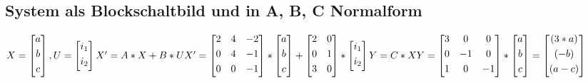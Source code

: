 \documentclass[11pt, a4paper, twoside]{article}   	%
\begin{document}
\subsection{System als Blockschaltbild und in A, B, C Normalform}
$
X = \begin{bmatrix}
	a \\[0.3em]
	b \\[0.3em]
	c \\[0.3em]
\end{bmatrix}
,
U = \begin{bmatrix}
	i_1 \\[0.3em]
	i_2 \\[0.3em]
\end{bmatrix}
\newline
\newline
\newline
X'=A*X+B*U
\newline
\newline
X'= \begin{bmatrix}
	2 & 4 & -2 \\[0.3em]
	0 & 4 & -1 \\[0.3em]
	0 & 0 & -1 \\[0.3em]
\end{bmatrix}
*
\begin{bmatrix}
	a \\[0.3em]
	b \\[0.3em]
	c \\[0.3em]
\end{bmatrix}
+
\begin{bmatrix}
	2 & 0 \\[0.3em]
	0 & 1 \\[0.3em]
	3 & 0 \\[0.3em]
\end{bmatrix}
*
\begin{bmatrix}
	i_1 \\[0.3em]
	i_2 \\[0.3em]
\end{bmatrix}
\newline
\newline
\newline
\newline
Y=C*X
\newline
\newline
Y=
\begin{bmatrix}
	3 & 0 & 0 \\[0.3em]
	0 & -1 & 0 \\[0.3em]
	1 & 0 & -1 \\[0.3em]
\end{bmatrix}
*
\begin{bmatrix}
	a \\[0.3em]
	b \\[0.3em]
	c \\[0.3em]
\end{bmatrix}
=
\begin{bmatrix}
	(3*a) \\[0.3em]
	(-b) \\[0.3em]
	(a-c) \\[0.3em]
\end{bmatrix}
$
\end{document}
